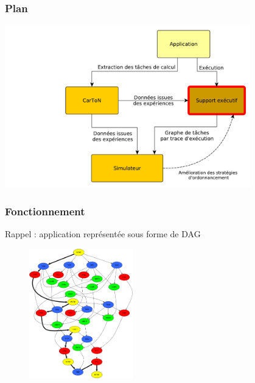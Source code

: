 \documentclass[xcolor={usenames,dvipsnames,svgnames,table}, aspectratio=43]{beamer}
\begin{document}
\begin{frame}
  \frametitle{Plan}
  \includegraphics[width=0.8\textwidth]{graph/big_picture-part2.pdf}
\end{frame}


\begin{frame}
\frametitle{Fonctionnement}

Rappel : application représentée sous forme de DAG

\begin{figure}
  \includegraphics[width=0.4\textwidth]{graph/cholesky-dag-5.pdf}
\end{figure}

\end{frame}
\end{document}
